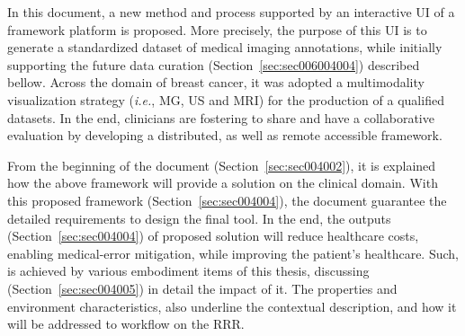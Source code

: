 In this document, a new method and process supported by an interactive \ac{UI} of a framework platform is proposed.
More precisely, the purpose of this \ac{UI} is to generate a standardized dataset of medical imaging annotations, while initially supporting the future data curation (Section~\ref{sec:sec006004004}) described bellow.
Across the domain of breast cancer, it was adopted a multimodality visualization strategy ({\it i.e.}, \ac{MG}, \ac{US} and \ac{MRI}) for the production of a qualified datasets.
In the end, clinicians are fostering to share and have a collaborative evaluation by developing a distributed, as well as remote accessible framework.

From the beginning of the document (Section~\ref{sec:sec004002}), it is explained how the above framework will provide a solution on the clinical domain.
With this proposed framework (Section~\ref{sec:sec004004}), the document guarantee the detailed requirements to design the final tool.
In the end, the outputs (Section~\ref{sec:sec004004}) of proposed solution will reduce healthcare costs, enabling medical-error mitigation, while improving the patient's healthcare.
Such, is achieved by various embodiment items of this thesis, discussing (Section~\ref{sec:sec004005}) in detail the impact of it.
The properties and environment characteristics, also underline the contextual description, and how it will be addressed to workflow on the \ac{RRR}.